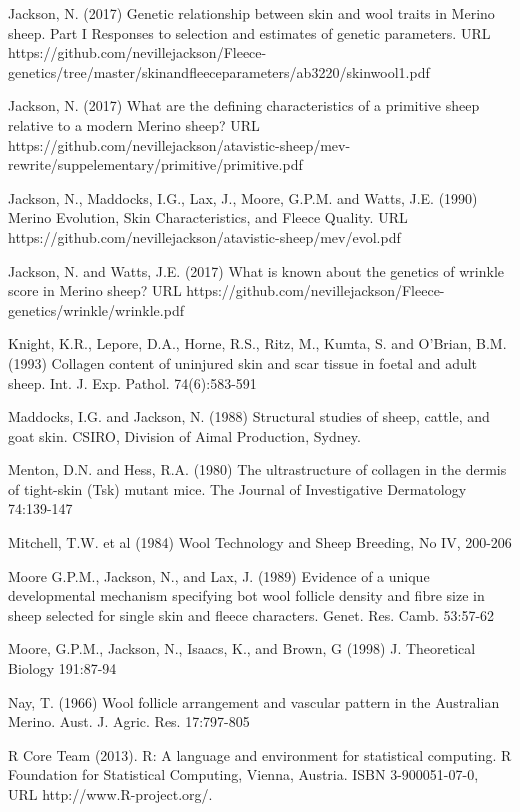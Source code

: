 \documentclass[titlepage]{article}  %
\begin{document}
\begin{thebibliography}{99}
Jackson, N. (2017) Genetic relationship between skin and wool traits in Merino sheep. Part I Responses to selection and estimates of genetic parameters. URL https://github.com/nevillejackson/Fleece-genetics/tree/master/skinandfleeceparameters/ab3220/skinwool1.pdf

Jackson, N. (2017) What are the defining characteristics of a primitive sheep relative to a modern Merino sheep? URL https://github.com/nevillejackson/atavistic-sheep/mev-rewrite/suppelementary/primitive/primitive.pdf

Jackson, N., Maddocks, I.G., Lax, J., Moore, G.P.M. and Watts, J.E. (1990) Merino Evolution, Skin Characteristics, and Fleece Quality. URL https://github.com/nevillejackson/atavistic-sheep/mev/evol.pdf 

Jackson, N. and Watts, J.E. (2017) What is known about the genetics of wrinkle score in Merino sheep? URL https://github.com/nevillejackson/Fleece-genetics/wrinkle/wrinkle.pdf

Knight, K.R., Lepore, D.A., Horne, R.S., Ritz, M., Kumta, S. and O'Brian, B.M. (1993) Collagen content of uninjured skin and scar tissue in foetal and adult sheep. Int. J. Exp. Pathol. 74(6):583-591

Maddocks, I.G. and Jackson, N. (1988) Structural studies of sheep, cattle, and goat skin. CSIRO, Division of Aimal Production, Sydney.

Menton, D.N. and Hess, R.A. (1980) The ultrastructure of collagen in the dermis of tight-skin (Tsk) mutant mice. The Journal of Investigative Dermatology 74:139-147

Mitchell, T.W. et al (1984) Wool Technology and Sheep Breeding, No IV, 200-206

Moore G.P.M., Jackson, N., and Lax, J. (1989) Evidence of a unique developmental mechanism specifying bot wool follicle density and fibre size in sheep selected for single skin and fleece characters. Genet. Res. Camb. 53:57-62

Moore, G.P.M., Jackson, N., Isaacs, K., and Brown, G (1998) J. Theoretical Biology 191:87-94

Nay, T. (1966) Wool follicle arrangement and vascular pattern in the Australian Merino. Aust. J. Agric. Res. 17:797-805

R Core Team (2013). R: A language and environment for statistical
  computing. R Foundation for Statistical Computing, Vienna, Austria.
  ISBN 3-900051-07-0, URL http://www.R-project.org/.


\end{thebibliography}
\end{document}
